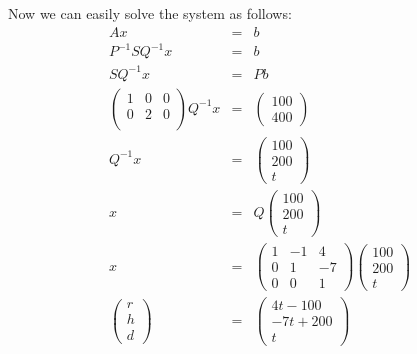 \documentclass{article}
\begin{document}
Now we can easily solve the system as follows:
\begin{eqnarray*}
  Ax &=& b \\
  P^{-1} S Q^{-1} x &=& b \\
  S Q^{-1} x &=& P b \\
  \left(
  \begin{array}{ccc}
    1 & 0 & 0 \\
    0 & 2 & 0 \\
  \end{array}\right) Q^{-1}x &=& \left(\begin{array}{c}
               100 \\
               400 
              \end{array}\right) \\
              Q^{-1}x &=& \left(\begin{array}{c}
               100 \\
               200 \\
               t
              \end{array}\right) \\
  x &=& Q \left(\begin{array}{c}
               100 \\
               200 \\
               t
              \end{array}\right) \\
  x &=& \left(
    \begin{array}{ccc}
      1 & -1 & 4 \\
      0 &  1 & -7 \\
      0 & 0 & 1 
    \end{array}\right) \left(\begin{array}{c}
      100 \\
      200 \\
      t
     \end{array}\right) \\
  \left(\begin{array}{c}
    r \\
    h \\
    d
  \end{array}\right) &=& \left(\begin{array}{c}
    4t - 100 \\
    -7t + 200 \\
    t
  \end{array}\right)
\end{eqnarray*}
\end{document}
